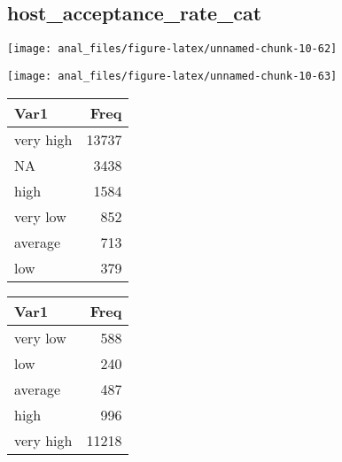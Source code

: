 \hypertarget{host_acceptance_rate_cat}{%
\subsection{host\_acceptance\_rate\_cat}\label{host_acceptance_rate_cat}}

\begin{center}\texttt{[image: anal\_files/figure-latex/unnamed-chunk-10-62]} \end{center}

\begin{center}\texttt{[image: anal\_files/figure-latex/unnamed-chunk-10-63]} \end{center}

\begin{table}[H]
\centering
\begin{tabular}[t]{lr}
\toprule
Var1 & Freq\\
\midrule
very high & 13737\\
NA & 3438\\
high & 1584\\
very low & 852\\
average & 713\\
\addlinespace
low & 379\\
\bottomrule
\end{tabular}
\end{table}
\pagebreak

\begin{center}


\begin{tabular}[t]{lr}
\toprule
Var1 & Freq\\
\midrule
very low & 588\\
low & 240\\
average & 487\\
high & 996\\
very high & 11218\\
\bottomrule
\end{tabular}
\end{center}
